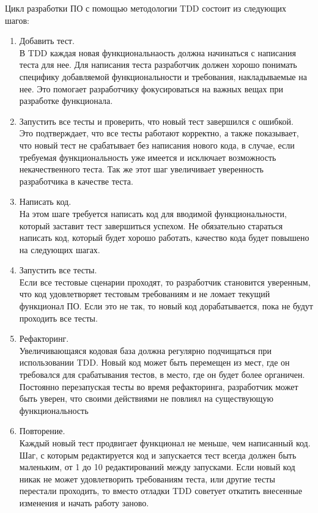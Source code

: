 Цикл разработки ПО с помощью методологии TDD состоит из следующих шагов:
\begin{enumerate}[label={\arabic*)}]
    \item Добавить тест.\\
        В TDD каждая новая функциональнаость должна начинаться с написания теста для нее.
        Для написания теста разработчик должен хорошо понимать специфику добавляемой 
        функциональности и требования, накладываемые на нее. Это помогает разработчику
        фокусироваться на важных вещах при разработке функционала.
    \item Запустить все тесты и проверить, что новый тест завершился с ошибкой.\\
        Это подтверждает, что все тесты работают корректно, а также показывает,
        что новый тест не срабатывает без написания нового кода, 
        в случае, если требуемая функциональность уже имеется и исключает 
        возможность некачественного теста.
        Так же этот шаг увеличивает уверенность разработчика в качестве теста.
    \item Написать код.\\
        На этом шаге требуется написать код для вводимой функциональности, который
        заставит тест завершиться успехом. Не обязательно стараться написать код, 
        который будет хорошо работать, качество кода будет повышено на следующих
        шагах.
    \item Запустить все тесты.\\
        Если все тестовые сценарии проходят, то разработчик становится уверенным,
        что код удовлетворяет тестовым требованиям и не ломает текущий функционал ПО.
        Если это не так, то новый код дорабатывается, пока не будут проходить все тесты.
    \item Рефакторинг.\\
        Увеличивающаяся кодовая база должна регулярно подчищаться при использовании TDD.
        Новый код может быть перемещен из мест, где он требовался для срабатывания тестов,
        в место, где он будет более органичен. Постоянно перезапуская тесты во время
        рефакторинга, разработчик может быть уверен, что своими действиями не повлиял на 
        существующую функциональность
    \item Повторение.\\
        Каждый новый тест продвигает функционал не меньше, чем написанный код.
        Шаг, с которым редактируется код и запускается тест всегда должен быть
        маленьким, от 1 до 10 редактирований между запусками.
        Если новый код никак не может удовлетворить требованиям теста, или
        другие тесты перестали проходить, то вместо отладки TDD советует откатить
        внесенные изменения и начать работу заново.
\end{enumerate}

